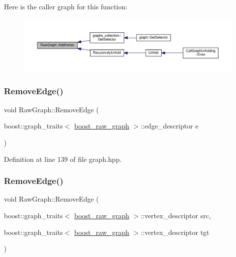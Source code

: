 Here is the caller graph for this function\+:
\nopagebreak
\begin{figure}[H]
\begin{center}
\leavevmode
\includegraphics[width=350pt]{dc/dd2/structRawGraph_ade8aabe1902c1e01ce11c0f62defd2e2_icgraph}
\end{center}
\end{figure}
\mbox{\label{structRawGraph_a9537d6d1e88f11128a60d9f48dc2f32a}} 
\subsubsection{\texorpdfstring{Remove\+Edge()}{RemoveEdge()}\hspace{0.1cm}{\footnotesize\ttfamily [1/2]}}
{\footnotesize\ttfamily void Raw\+Graph\+::\+Remove\+Edge (\begin{DoxyParamCaption}\item[{boost\+::graph\+\_\+traits$<$ \hyperlink{graph_8hpp_afdae34b3d2ab29778d96da05f66add5c}{boost\+\_\+raw\+\_\+graph} $>$\+::edge\+\_\+descriptor}]{e }\end{DoxyParamCaption})\hspace{0.3cm}{\ttfamily [inline]}}



Definition at line 139 of file graph.\+hpp.

\mbox{\label{structRawGraph_aec71822f026381203f4a3fc7414353a0}} 
\subsubsection{\texorpdfstring{Remove\+Edge()}{RemoveEdge()}\hspace{0.1cm}{\footnotesize\ttfamily [2/2]}}
{\footnotesize\ttfamily void Raw\+Graph\+::\+Remove\+Edge (\begin{DoxyParamCaption}\item[{boost\+::graph\+\_\+traits$<$ \hyperlink{graph_8hpp_afdae34b3d2ab29778d96da05f66add5c}{boost\+\_\+raw\+\_\+graph} $>$\+::vertex\+\_\+descriptor}]{src,  }\item[{boost\+::graph\+\_\+traits$<$ \hyperlink{graph_8hpp_afdae34b3d2ab29778d96da05f66add5c}{boost\+\_\+raw\+\_\+graph} $>$\+::vertex\+\_\+descriptor}]{tgt }\end{DoxyParamCaption})\hspace{0.3cm}{\ttfamily [inline]}}



